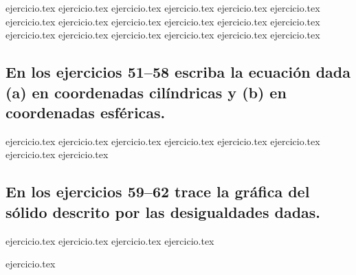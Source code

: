 \begin{enumerate}
    \setcounter{enumi}{32}
    {ejercicio.tex}
{ejercicio.tex}
{ejercicio.tex}
{ejercicio.tex}
{ejercicio.tex}
{ejercicio.tex}
{ejercicio.tex}
{ejercicio.tex}
{ejercicio.tex}
{ejercicio.tex}
{ejercicio.tex}
{ejercicio.tex}
{ejercicio.tex}
{ejercicio.tex}
{ejercicio.tex}
{ejercicio.tex}
{ejercicio.tex}
{ejercicio.tex}
\end{enumerate}

\vspace{0.3cm}
\subsection*{En los ejercicios 51--58 escriba la ecuación dada (a) en coordenadas cilíndricas y (b) en coordenadas esféricas.}

\begin{enumerate}
    \setcounter{enumi}{50}
    {ejercicio.tex}
{ejercicio.tex}
{ejercicio.tex}
{ejercicio.tex}
{ejercicio.tex}
{ejercicio.tex}
{ejercicio.tex}
{ejercicio.tex}
\end{enumerate}

\vspace{0.3cm}
\subsection*{En los ejercicios 59--62 trace la gráfica del sólido descrito por las desigualdades dadas.}

\begin{enumerate}
    \setcounter{enumi}{58}
    {ejercicio.tex}
{ejercicio.tex}
{ejercicio.tex}
{ejercicio.tex}
\end{enumerate}

\vspace{0.3cm}
\begin{enumerate}
    \setcounter{enumi}{62}
    {ejercicio.tex}
\end{enumerate}
